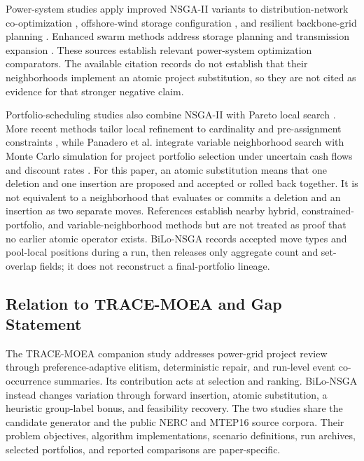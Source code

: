 \documentclass[applsci,article,submit,moreauthors]{Definitions/mdpi}
\begin{document}
Power-system studies apply improved NSGA-II variants to distribution-network co-optimization \cite{ref26}, offshore-wind storage configuration \cite{ref27}, and resilient backbone-grid planning \cite{ref28}. Enhanced swarm methods address storage planning \cite{ref29} and transmission expansion \cite{ref30}. These sources establish relevant power-system optimization comparators. The available citation records do not establish that their neighborhoods implement an atomic project substitution, so they are not cited as evidence for that stronger negative claim.

Portfolio-scheduling studies also combine NSGA-II with Pareto local search \cite{ref31}. More recent methods tailor local refinement to cardinality and pre-assignment constraints \cite{ref32}, while Panadero et al. integrate variable neighborhood search with Monte Carlo simulation for project portfolio selection under uncertain cash flows and discount rates \cite{ref34}. For this paper, an atomic substitution means that one deletion and one insertion are proposed and accepted or rolled back together. It is not equivalent to a neighborhood that evaluates or commits a deletion and an insertion as two separate moves. References \cite{ref31,ref32,ref34} establish nearby hybrid, constrained-portfolio, and variable-neighborhood methods but are not treated as proof that no earlier atomic operator exists. BiLo-NSGA records accepted move types and pool-local positions during a run, then releases only aggregate count and set-overlap fields; it does not reconstruct a final-portfolio lineage.

\subsection{Relation to TRACE-MOEA and Gap Statement}\label{relation-to-trace-moea-and-gap-statement}

The TRACE-MOEA companion study \cite{ref33} addresses power-grid project review through preference-adaptive elitism, deterministic repair, and run-level event co-occurrence summaries. Its contribution acts at selection and ranking. BiLo-NSGA instead changes variation through forward insertion, atomic substitution, a heuristic group-label bonus, and feasibility recovery. The two studies share the candidate generator and the public NERC and MTEP16 source corpora. Their problem objectives, algorithm implementations, scenario definitions, run archives, selected portfolios, and reported comparisons are paper-specific.
\end{document}
